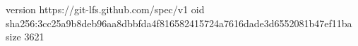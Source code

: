 version https://git-lfs.github.com/spec/v1
oid sha256:3cc25a9b8deb96aa8dbbfda4f816582415724a7616dade3d6552081b47ef11ba
size 3621

